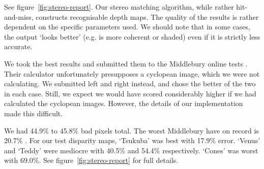See figure~\ref{fig:stereo-report}. Our stereo matching algorithm, while rather
hit-and-miss, constructs recognisable depth maps. The quality of the results is
rather dependent on the specific parameters used. We should note that in some
cases, the output `looks better' (e.g. is more coherent or shaded) even if it is
strictly less accurate.

We took the best results and submitted them to the Middlebury online tests
\cite{middlebury, stereocorrespondence}. Their calculator unfortunately
presupposes a cyclopean image, which we were not calculating. We submitted left
and right instead, and chose the better of the two in each case. Still, we
expect we would have scored considerably higher if we had calculated the
cyclopean images. However, the details of our implementation made this
difficult.

We had 44.9\% to 45.8\% bad pixels total. The worst Middlebury have on record is
20.7\% \cite{middlebury, stereocorrespondence}. For our test disparity maps,
`Tsukuba' was best with 17.9\% error. `Venus' and `Teddy' were mediocre with
40.5\% and 54.4\% respectively. `Cones' was worst with 69.0\%. See
figure~\ref{fig:stereo-report} for full details.


